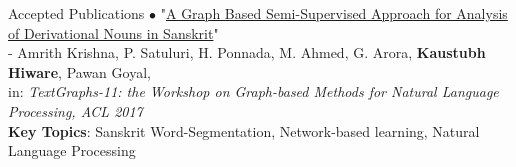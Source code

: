 \documentclass{resume} %
\begin{document}
\begin{rSection}{Accepted Publications}
$\bullet$ "\href{http://www.aclweb.org/anthology/W17-2409}{A Graph Based Semi-Supervised Approach for Analysis of Derivational Nouns in Sanskrit}" \\
- Amrith Krishna, P. Satuluri, H. Ponnada, M. Ahmed, G. Arora, \textbf{Kaustubh Hiware}, Pawan Goyal, \\
in: \textit{TextGraphs-11: the Workshop on Graph-based Methods for Natural Language Processing, ACL 2017}\\
\textbf{\small Key Topics}: Sanskrit Word-Segmentation, Network-based learning, Natural Language Processing

\end{rSection}

\end{document}
